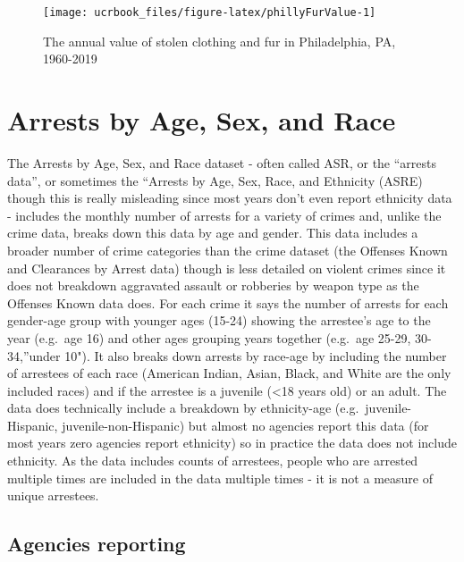\documentclass[
  12pt,
  openany]{book}
\begin{document}
\begin{figure}

{\centering \texttt{[image: ucrbook\_files/figure-latex/phillyFurValue-1]} 

}

\caption{The annual value of stolen clothing and fur in Philadelphia, PA, 1960-2019}\label{fig:phillyFurValue}
\end{figure}

\hypertarget{arrests}{%
\chapter{Arrests by Age, Sex, and Race}\label{arrests}}

The Arrests by Age, Sex, and Race dataset - often called ASR, or the ``arrests data'', or sometimes the ``Arrests by Age, Sex, Race, and Ethnicity (ASRE) though this is really misleading since most years don't even report ethnicity data - includes the monthly number of arrests for a variety of crimes and, unlike the crime data, breaks down this data by age and gender. This data includes a broader number of crime categories than the crime dataset (the Offenses Known and Clearances by Arrest data) though is less detailed on violent crimes since it does not breakdown aggravated assault or robberies by weapon type as the Offenses Known data does. For each crime it says the number of arrests for each gender-age group with younger ages (15-24) showing the arrestee's age to the year (e.g.~age 16) and other ages grouping years together (e.g.~age 25-29, 30-34,''under 10"). It also breaks down arrests by race-age by including the number of arrestees of each race (American Indian, Asian, Black, and White are the only included races) and if the arrestee is a juvenile (\textless18 years old) or an adult. The data does technically include a breakdown by ethnicity-age (e.g.~juvenile-Hispanic, juvenile-non-Hispanic) but almost no agencies report this data (for most years zero agencies report ethnicity) so in practice the data does not include ethnicity. As the data includes counts of arrestees, people who are arrested multiple times are included in the data multiple times - it is not a measure of unique arrestees.

\hypertarget{agencies-reporting-2}{%
\section{Agencies reporting}\label{agencies-reporting-2}}
\end{document}
